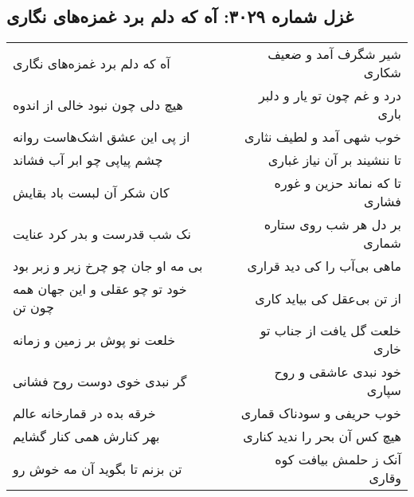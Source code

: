 \begin{center}
\section*{غزل شماره ۳۰۲۹: آه که دلم برد غمزه‌های نگاری}
\label{sec:3029}
\begin{longtable}{l p{0.5cm} r}
آه که دلم برد غمزه‌های نگاری
&&
شیر شگرف آمد و ضعیف شکاری
\\
هیچ دلی چون نبود خالی از اندوه
&&
درد و غم چون تو یار و دلبر باری
\\
از پی این عشق اشک‌هاست روانه
&&
خوب شهی آمد و لطیف نثاری
\\
چشم پیاپی چو ابر آب فشاند
&&
تا ننشیند بر آن نیاز غباری
\\
کان شکر آن لبست باد بقایش
&&
تا که نماند حزین و غوره فشاری
\\
نک شب قدرست و بدر کرد عنایت
&&
بر دل هر شب روی ستاره شماری
\\
بی مه او جان چو چرخ زیر و زبر بود
&&
ماهی بی‌آب را کی دید قراری
\\
خود تو چو عقلی و این جهان همه چون تن
&&
از تن بی‌عقل کی بیاید کاری
\\
خلعت نو پوش بر زمین و زمانه
&&
خلعت گل یافت از جناب تو خاری
\\
گر نبدی خوی دوست روح فشانی
&&
خود نبدی عاشقی و روح سپاری
\\
خرقه بده در قمارخانه عالم
&&
خوب حریفی و سودناک قماری
\\
بهر کنارش همی کنار گشایم
&&
هیچ کس آن بحر را ندید کناری
\\
تن بزنم تا بگوید آن مه خوش رو
&&
آنک ز حلمش بیافت کوه وقاری
\\
\end{longtable}
\end{center}
